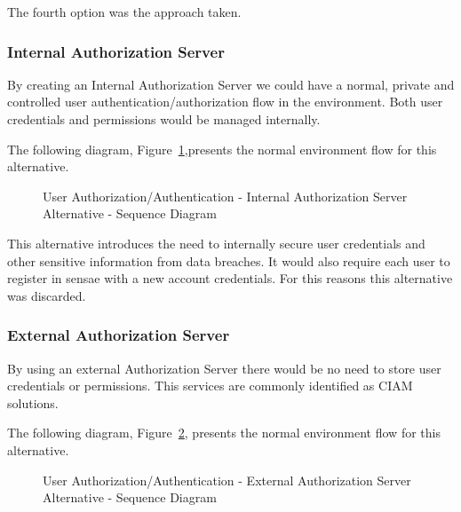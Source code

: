 The fourth option was the approach taken.

\subsubsection{Internal Authorization Server}
\label{subsubsec:design:alternatives:auth:internalauth}

By creating an Internal Authorization Server we could have a normal, private and controlled user authentication/authorization flow in the environment. Both user credentials and permissions would be managed internally.

The following diagram, Figure~\ref{fig:design:alternatives:auth:internalauth:diagram},presents the normal environment flow for this alternative.

\begin{figure}[H]
   \centering
   \resizebox{\columnwidth}{!}
   {
      
   }
   \caption[User Authorization/Authentication - Internal Authorization Server Alternative - Sequence Diagram]{User Authorization/Authentication - Internal Authorization Server Alternative - Sequence Diagram}
   \label{fig:design:alternatives:auth:internalauth:diagram}
\end{figure}

This alternative introduces the need to internally secure user credentials and other sensitive information from data breaches. It would also require each user to register in sensae with a new account credentials. For this reasons this alternative was discarded.

\subsubsection{External Authorization Server}
\label{subsubsec:design:alternatives:auth:externalauth}

By using an external Authorization Server there would be no need to store user credentials or permissions. This services are commonly identified as \gls{CIAM} solutions.

The following diagram, Figure~\ref{fig:design:alternatives:auth:externalauth:diagram}, presents the normal environment flow for this alternative.

\begin{figure}[H]
   \centering
   \resizebox{\columnwidth}{!}
   {
      
   }
   \caption[User Authorization/Authentication - External Authorization Server Alternative - Sequence Diagram]{User Authorization/Authentication - External Authorization Server Alternative - Sequence Diagram}
   \label{fig:design:alternatives:auth:externalauth:diagram}
\end{figure}

